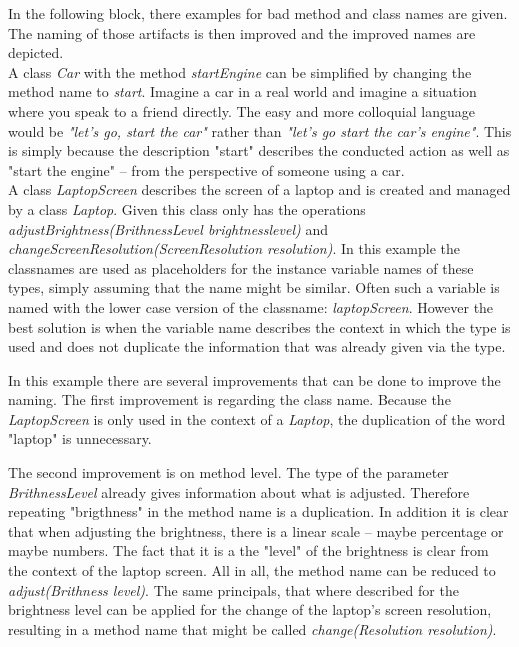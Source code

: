 In the following block, there examples for bad method and class names are given. The naming of those artifacts is then improved and the improved names are depicted. 
\\

A class \textit{Car} with the method \textit{startEngine} can be simplified by changing the method name to \textit{start}. Imagine a car in a real world and imagine a situation where you speak to a friend directly. The easy and more colloquial language would be \textit{"let's go, start the car"} rather than \textit{"let's go start the car's engine"}. This is simply because the description "start" describes the conducted action as well as "start the engine" -- from the perspective of someone using a car.\\

A class \textit{LaptopScreen} describes the screen of a laptop and is created and managed by a class \textit{Laptop}. Given this class only has the operations \textit{adjustBrightness(BrithnessLevel brightnesslevel)} and \textit{changeScreenResolution(ScreenResolution resolution)}. In this example the classnames are used as placeholders for the instance variable names of these types, simply assuming that the name might be similar. Often such a variable is named with the lower case version of the classname: \textit{laptopScreen}. However the best solution is when the variable name describes the context in which the type is used and does not duplicate the information that was already given via the type.  

In this example there are several improvements that can be done to improve the naming. The first improvement is regarding the class name. Because the \textit{LaptopScreen} is only used in the context of a \textit{Laptop}, the duplication of the word "laptop" is unnecessary.

The second improvement is on method level. The type of the parameter \textit{BrithnessLevel} already gives information about what is adjusted. Therefore repeating "brigthness" in the method name is a duplication. In addition it is clear that when adjusting the brightness, there is a linear scale -- maybe percentage or maybe numbers. The fact that it is a the "level" of the brightness is clear from the context of the laptop screen. All in all, the method name can be reduced to \textit{adjust(Brithness level)}. The same principals, that where described for the brightness level can be applied for the change of the laptop's screen resolution, resulting in a method name that might be called \textit{change(Resolution resolution)}.


